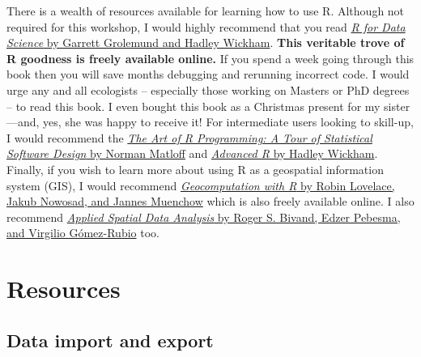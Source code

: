\documentclass[]{book}
\begin{document}
There is a wealth of resources available for learning how to use R.
Although not required for this workshop, I would highly recommend that
you read \href{https://r4ds.had.co.nz/}{\emph{R for Data Science} by
Garrett Grolemund and Hadley Wickham}. \textbf{This veritable trove of R
goodness is freely available online.} If you spend a week going through
this book then you will save months debugging and rerunning incorrect
code. I would urge any and all ecologists -- especially those working on
Masters or PhD degrees -- to read this book. I even bought this book as
a Christmas present for my sister---and, yes, she was happy to receive
it! For intermediate users looking to skill-up, I would recommend the
\href{http://shop.oreilly.com/product/9781593273842.do}{\emph{The Art of
R Programming: A Tour of Statistical Software Design} by Norman Matloff}
and \href{https://adv-r.hadley.nz/}{\emph{Advanced R} by Hadley
Wickham}. Finally, if you wish to learn more about using R as a
geospatial information system (GIS), I would recommend
\href{https://geocompr.robinlovelace.net/}{\emph{Geocomputation with R}
by Robin Lovelace, Jakub Nowosad, and Jannes Muenchow} which is also
freely available online. I also recommend
\href{https://www.springer.com/gp/book/9781461476177}{\emph{Applied
Spatial Data Analysis} by Roger S. Bivand, Edzer Pebesma, and Virgilio
Gómez-Rubio} too.

\part{Resources}\label{part-resources}

\chapter{Data import and export}\label{data-import-and-export}
\end{document}
